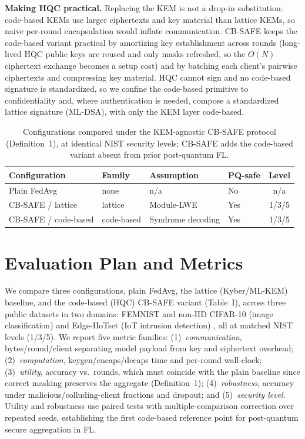 \documentclass[conference]{IEEEtran}
\begin{document}
\textbf{Making HQC practical.} Replacing the KEM is not a drop-in substitution: code-based KEMs use
larger ciphertexts and key material than lattice KEMs, so naive per-round encapsulation would
inflate communication. CB-SAFE keeps the code-based variant practical by amortizing key
establishment across rounds (long-lived HQC public keys are reused and only masks refreshed, so the
$O(N)$ ciphertext exchange becomes a setup cost) and by batching each client's pairwise ciphertexts
and compressing key material. HQC cannot sign and no code-based signature is standardized, so we
confine the code-based primitive to confidentiality and, where authentication is needed, compose a
standardized lattice signature (ML-DSA), with only the KEM layer code-based.

\begin{table}[t]
\caption{Configurations compared under the KEM-agnostic CB-SAFE protocol (Definition~1), at
identical NIST security levels; CB-SAFE adds the code-based variant absent from prior
post-quantum FL.}
\label{tab:config}
\centering
\footnotesize
\setlength{\tabcolsep}{4pt}
\begin{tabular}{@{}llll c@{}}
\toprule
Configuration & Family & Assumption & PQ-safe & Level\\
\midrule
Plain FedAvg          & none       & n/a               & No  & n/a\\
CB-SAFE / lattice     & lattice    & Module-LWE        & Yes & 1/3/5\\
CB-SAFE / code-based  & code-based & Syndrome decoding & Yes & 1/3/5\\
\bottomrule
\end{tabular}
\end{table}

\section{Evaluation Plan and Metrics}
We compare three configurations, plain FedAvg, the lattice (Kyber/ML-KEM) baseline, and the
code-based (HQC) CB-SAFE variant (Table~I), across three public datasets in two domains: FEMNIST
and non-IID CIFAR-10 (image classification) and Edge-IIoTset (IoT intrusion detection)
\cite{narsimhulu2026,singh2025pqfog}, all at matched NIST levels (1/3/5). We report five metric
families: (1)~\emph{communication}, bytes/round/client separating model payload from key and
ciphertext overhead; (2)~\emph{computation}, keygen/encaps/decaps time and per-round wall-clock;
(3)~\emph{utility}, accuracy vs.\ rounds, which must coincide with the plain baseline since correct
masking preserves the aggregate (Definition~1); (4)~\emph{robustness}, accuracy under
malicious/colluding-client fractions and dropout; and (5)~\emph{security level}. Utility and
robustness use paired tests with multiple-comparison correction over repeated seeds, establishing
the first code-based reference point for post-quantum secure aggregation in FL.
\end{document}
